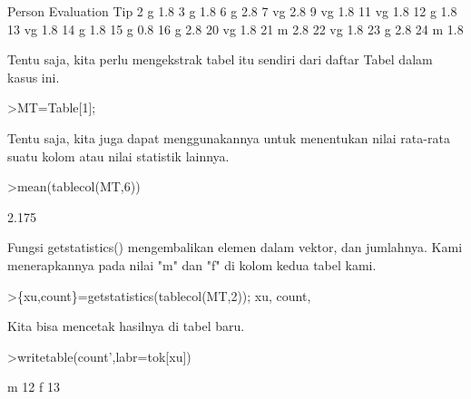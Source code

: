 \documentclass[a4paper,10pt]{article}
\begin{document}
\begin{eulernotebook}
\begin{eulercomment}
\begin{eulercomment}
\begin{euleroutput}
      Person Evaluation       Tip
           2          g       1.8
           3          g       1.8
           6          g       2.8
           7         vg       2.8
           9         vg       1.8
          11         vg       1.8
          12          g       1.8
          13         vg       1.8
          14          g       1.8
          15          g       0.8
          16          g       2.8
          20         vg       1.8
          21          m       2.8
          22         vg       1.8
          23          g       2.8
          24          m       1.8
\end{euleroutput}
\begin{eulercomment}
Tentu saja, kita perlu mengekstrak tabel itu sendiri dari daftar Tabel
dalam kasus ini.
\end{eulercomment}
\begin{eulerprompt}
>MT=Table[1];
\end{eulerprompt}
\begin{eulercomment}
Tentu saja, kita juga dapat menggunakannya untuk menentukan nilai
rata-rata suatu kolom atau nilai statistik lainnya.
\end{eulercomment}
\begin{eulerprompt}
>mean(tablecol(MT,6))
\end{eulerprompt}
\begin{euleroutput}
  2.175
\end{euleroutput}
\begin{eulercomment}
Fungsi getstatistics() mengembalikan elemen dalam vektor, dan
jumlahnya. Kami menerapkannya pada nilai "m" dan "f" di kolom kedua
tabel kami.
\end{eulercomment}
\begin{eulerprompt}
>\{xu,count\}=getstatistics(tablecol(MT,2)); xu, count,
\end{eulerprompt}
\begin{euleroutput}
  [1,  3]
  [12,  13]
\end{euleroutput}
\begin{eulercomment}
Kita bisa mencetak hasilnya di tabel baru.
\end{eulercomment}
\begin{eulerprompt}
>writetable(count',labr=tok[xu])
\end{eulerprompt}
\begin{euleroutput}
           m        12
           f        13
\end{euleroutput}
\begin{eulercomment}

\end{eulercomment}
\end{eulercomment}
\end{eulercomment}
\end{eulernotebook}
\end{document}

